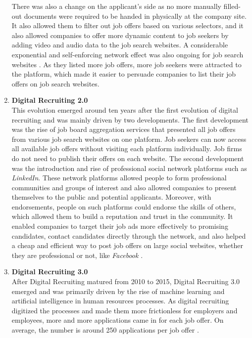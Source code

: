 \documentclass[draft,final]{thesisclass} %
\begin{document}
\begin{enumerate}
    There was also a change on the applicant's side as no more manually filled-out documents were required to be handed in physically at the company site.
    It also allowed them to filter out job offers based on various selectors, and it also allowed companies to offer more dynamic content to job seekers by adding video and audio data to the job search websites.
    A considerable exponential and self-enforcing network effect was also ongoing for job search websites \parencite[3]{ai_recruiting}.
    As they listed more job offers, more job seekers were attracted to the platform, which made it easier to persuade companies to list their job offers on job search websites.
    \item \textbf{Digital Recruiting 2.0} \label{digital_recruiting_2}\\
    This evolution emerged around ten years after the first evolution of digital recruiting and was mainly driven by two developments.
    The first development was the rise of job board aggregation services that presented all job offers from various job search websites on one platform.
    Job seekers can now access all available job offers without visiting each platform individually. Job firms do not need to publish their offers on each website.
    The second development was the introduction and rise of professional social network platforms such as \textit{LinkedIn}.
    These network platforms allowed people to form professional communities and groups of interest and also allowed companies to present themselves to the public and potential applicants.
    Moreover, with endorsements, people on such platforms could endorse the skills of others, which allowed them to build a reputation and trust in the community.
    It enabled companies to target their job ads more effectively to promising candidates, contact candidates directly through the network, and also helped a cheap and efficient way to post job offers on large social websites, whether they are professional or not, like \textit{Facebook} \parencite[3]{ai_recruiting}.
    \item \textbf{Digital Recruiting 3.0} \label{digital_recruiting_3}\\
    After Digital Recruiting matured from 2010 to 2015, Digital Recruiting 3.0 emerged and was primarily driven by the rise of machine learning and artificial intelligence in human resources processes.
    As digital recruiting digitized the processes and made them more frictionless for employers and employees, more and more applications came in for each job offer. On average, the number is around 250 applications per job offer \parencite[4]{ai_recruiting}. 

\end{enumerate}
\end{document}
